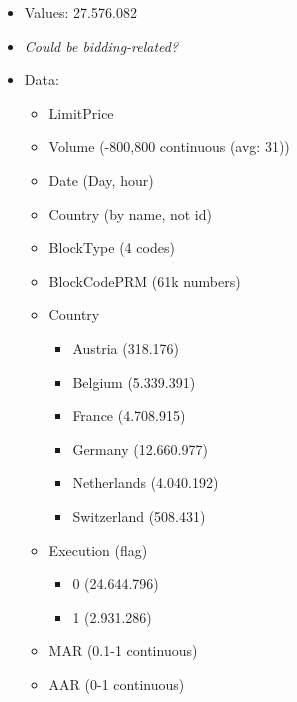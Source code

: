 \begin{itemize}
\begin{itemize}
            \item Values: 27.576.082
            
            \item \textit{Could be bidding-related?}
            
            \item Data:
            \begin{itemize}
                \item LimitPrice
                
                \item Volume (-800,800 continuous (avg: 31))
                
                \item Date (Day, hour)
                
                \item Country (by name, not id)
                
                \item BlockType (4 codes)
                
                \item BlockCodePRM (61k numbers)
                
                \item Country
                \begin{itemize}
                    \item Austria (318.176)
                    \item Belgium (5.339.391)
                    \item France (4.708.915)
                    \item Germany (12.660.977)
                    \item Netherlands (4.040.192)
                    \item Switzerland (508.431)
                \end{itemize}
                
                \item Execution (flag)
                \begin{itemize}
                    \item 0 (24.644.796)
                    \item 1 (2.931.286)
                \end{itemize}
                
                \item MAR (0.1-1 continuous)
                
                \item AAR (0-1 continuous)
                
            \end{itemize}
        \end{itemize}
    \end{itemize}
    
